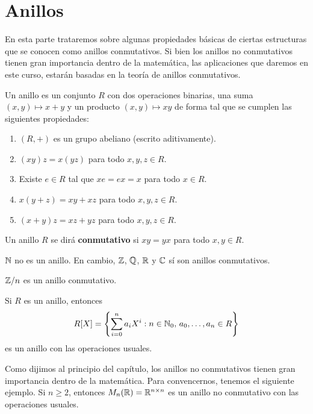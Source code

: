 \chapter{Anillos}

En esta parte trataremos sobre algunas propiedades básicas de ciertas
estructuras que se conocen como anillos conmutativos. Si bien los anillos no conmutativos tienen gran importancia dentro de la matemática, 
las aplicaciones que daremos en este curso, estarán basadas en la teoría de anillos conmutativos.

\begin{definition}
Un anillo es un conjunto $R$ con dos operaciones binarias, una suma $(x,y)\mapsto x+y$ y un producto $(x,y)\mapsto xy$ de forma tal que  
se cumplen las siguientes propiedades:
\begin{enumerate}
\item $(R,+)$ es un grupo abeliano (escrito aditivamente).
\item $(xy)z=x(yz)$ para todo $x,y,z\in R$.
\item Existe $e\in R$ tal que $xe=ex=x$ para todo $x\in R$.
\item $x(y+z)=xy+xz$ para todo $x,y,z\in R$.
\item $(x+y)z=xz+yz$ para todo $x,y,z\in R$.
\end{enumerate}
\end{definition}

\begin{definition}
Un anillo $R$ se dirá \textbf{conmutativo} si $xy=yx$ para todo $x,y\in R$.
\end{definition}

\begin{examples}
$\mathbb{N}$ no es un anillo. En cambio, 
$\mathbb{Z}$, $\mathbb{Q}$, $\mathbb{R}$ y $\mathbb{C}$ sí son anillos conmutativos.
\end{examples}

\begin{example}
$\mathbb{Z}/n$ es un anillo conmutativo.
\end{example}

\begin{example}
Si $R$ es un anillo, entonces 
\[
R[X]=\left\{\sum_{i=0}^n a_iX^i:n\in\mathbb{N}_0,\,a_0,\dots,a_n\in R\right\}
\]
es un anillo con las operaciones usuales.    	
\end{example}

Como dijimos al principio del capítulo, los anillos no conmutativos tienen gran importancia dentro de la matemática. Para convencernos, 
tenemos el siguiente ejemplo. Si $n\geq2$, entonces 
$M_n(\mathbb{R})=\mathbb{R}^{n\times n}$ es un anillo no conmutativo con las operaciones usuales. 

